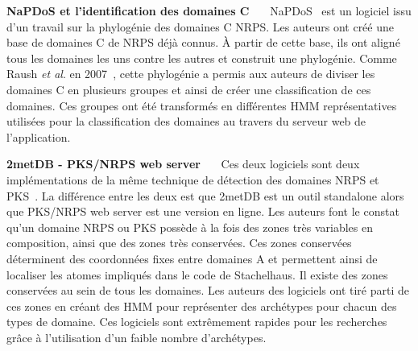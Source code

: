 \textbf{NaPDoS et l'identification des domaines C}~~~
NaPDoS~\cite{ziemert_natural_2012} est un logiciel issu d'un travail sur la phylogénie des domaines C NRPS.
Les auteurs ont créé une base de domaines C de NRPS déjà connus.
À partir de cette base, ils ont aligné tous les domaines les uns contre les autres et construit une phylogénie.
Comme Raush \textit{et al}. en 2007~\cite{rausch_phylogenetic_2007}, cette phylogénie a permis aux auteurs de diviser les domaines C en plusieurs groupes et ainsi de créer une classification de ces domaines.
Ces groupes ont été transformés en différentes HMM représentatives utilisées pour la classification des domaines au travers du serveur web de l'application.


\textbf{2metDB - PKS/NRPS web server}~~~
Ces deux logiciels sont deux implémentations de la même technique de détection des domaines NRPS et PKS~\cite{bachmann_chapter_2009}.
La différence entre les deux est que 2metDB est un outil standalone alors que PKS/NRPS web server est une version en ligne.
Les auteurs font le constat qu'un domaine NRPS ou PKS possède à la fois des zones très variables en composition, ainsi que des zones très conservées.
Ces zones conservées déterminent des coordonnées fixes entre domaines A et permettent ainsi de localiser les atomes impliqués dans le code de Stachelhaus.
Il existe des zones conservées au sein de tous les domaines.
Les auteurs des logiciels ont tiré parti de ces zones en créant des HMM pour représenter des archétypes pour chacun des types de domaine.
Ces logiciels sont extrêmement rapides pour les recherches grâce à l'utilisation d'un faible nombre d'archétypes.


